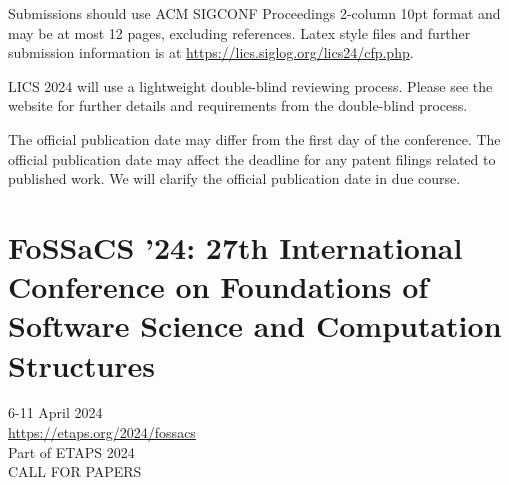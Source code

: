 \documentclass[prodmode,acmtecs]{acmsmall} %
\begin{document}
\begin{itemize}
  Submissions should use ACM SIGCONF Proceedings 2-column 10pt format and may be at most 12 pages, excluding references. Latex style files and further submission information is at \href{https://lics.siglog.org/lics24/cfp.php}{https://lics.siglog.org/lics24/cfp.php}.  
 
  LICS 2024 will use a lightweight double-blind reviewing process. Please see the website for further details and requirements from the double-blind process. 
 
  The official publication date may differ from the first day of the conference. The official publication date may affect the deadline for any patent filings related to published work. We will clarify the official publication date in due course. 
 
\end{itemize}\section{FoSSaCS '24: 27th International Conference on Foundations of Software Science and Computation Structures}\label{FoSSaCS24}  6-11 April 2024\\ 
  \href{https://etaps.org/2024/fossacs}{https://etaps.org/2024/fossacs}\\ 
  Part of ETAPS 2024\\ 
CALL FOR PAPERS 
\end{document}
